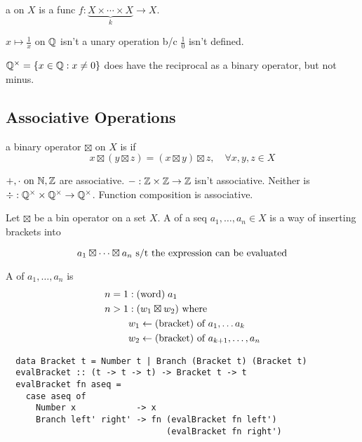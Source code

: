\documentclass[12pt]{article}
\begin{document}
\bbox
\begin{defn}
  a  on \(X\) is a func \(f:\underset k{\underbrace{
  X\times\cdots\times X}}\to X\).
\end{defn}
\ebox

\bboxnote
\(x\mapsto\frac1x\) on \(\mathbb Q\) isn't a unary operation b/c \(\frac10\) isn't
defined.

\(\mathbb Q^\times=\{x\in\mathbb Q:x\neq 0\}\) does have the reciprocal as a binary operator,
but not minus.
\ebox

\subsection{Associative Operations}
\newcommand{\gop}[0]{\boxtimes}

\bbox
\begin{defn}
  a binary operator \(\gop\) on \(X\) is  if 
  \[x\gop(y\gop z)=(x\gop y)\gop z,\quad\forall x,y,z\in X\]
\end{defn}
\ebox

\bboxnote
\(+,\cdot\text{ on }\mathbb N,\mathbb Z\) are associative. \(-:\mathbb Z\times\mathbb Z\to\mathbb Z\) isn't
associative. Neither is \(\div:\mathbb Q^\times\times\mathbb Q^\times\to\mathbb Q^\times\). Function
composition is associative.
\ebox

\bbox
\begin{defn}
  Let \(\gop\) be a bin operator on a set \(X\). A  of a seq
  \(a_1,\dots,a_n\in X\) is a way of inserting brackets into
\end{defn}
\[a_1\gop\cdots\gop a_n\st\T{the expression can be evaluated}\]
\ebox


\bbox
\begin{defn}[Bracketing]
  A  of \(a_1,\dots,a_n\) is
  \begin{equation*}
    \begin{split}
      n=1 &:\TM{word}\;a_1\\
      n>1 &:(w_1\gop w_2)\T{ where}\\
          &w_1\is\TM{bracket}\T{ of }a_1,\dots a_k\\
          &w_2\is\TM{bracket}\T{ of }a_{k+1},\dots,a_n
    \end{split}
  \end{equation*}
\end{defn}
\ebox

\begin{tcolorbox}[colback=red!20!white,colframe=red]
  \begin{verbatim}
  data Bracket t = Number t | Branch (Bracket t) (Bracket t) 
  evalBracket :: (t -> t -> t) -> Bracket t -> t
  evalBracket fn aseq =
    case aseq of
      Number x            -> x
      Branch left' right' -> fn (evalBracket fn left')
                                (evalBracket fn right')\end{verbatim}
\end{tcolorbox}
\end{document}
